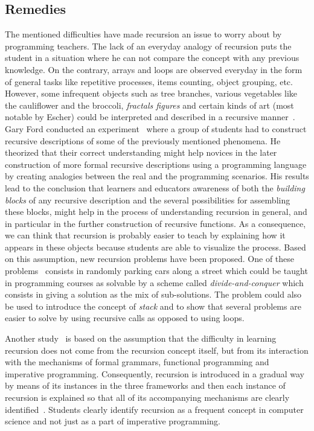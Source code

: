 \subsection{Remedies}

The mentioned difficulties have made recursion an issue to worry
about by programming teachers. The lack of an everyday analogy of
recursion puts the student in a situation where he can not compare
the concept with any previous knowledge. On the contrary, arrays
and loops are observed everyday in the form of general tasks like
repetitive processes, items counting, object grouping, etc. However,
some infrequent objects such as tree branches, various vegetables
like the cauliflower and the broccoli, \emph{fractals figures} and
certain kinds of art (most notable by Escher) could be interpreted and
described in a recursive manner~\cite{LevyLapidot:2002}. Gary Ford
conducted an experiment~\cite{LevyLapidot:2002} where a group of
students had to construct recursive descriptions of some of the
previously mentioned phenomena. He theorized that their correct
understanding might help novices in the later construction of more
formal recursive descriptions using a programming language by creating
analogies between the real and the programming scenarios. His results
lead to the conclusion that learners and educators awareness of both
the \emph{building blocks} of any recursive description and the
several possibilities for assembling these blocks, might help in the
process of understanding recursion in general, and in particular in
the further construction of recursive functions. As a consequence, we
can think that recursion is probably easier to teach by explaining how
it appears in these objects because students are able to visualize the
process. Based on this assumption, new recursion problems have been
proposed. One of these problems~\cite{Wirth:2008} consists in randomly
parking cars along a street which could be taught in programming
courses as solvable by a scheme called
\emph{divide\hyp{}and\hyp{}conquer} which consists in giving a
solution as the mix of sub\hyp{}solutions. The problem could also be
used to introduce the concept of \emph{stack} and to show that several
problems are easier to solve by using recursive calls as opposed to
using loops.

Another study~\cite{Velazquez:1999} is based on the assumption that
the difficulty in learning recursion does not come from the recursion
concept itself, but from its interaction with the mechanisms of formal
grammars, functional programming and imperative programming.
Consequently, recursion is introduced in a gradual way by means of
its instances in the three frameworks and then each instance of
recursion is explained so that all of its accompanying mechanisms are
clearly identified~\cite{Velazquez:2000}. Students clearly identify
recursion as a frequent concept in computer science and not just as a
part of imperative programming.


